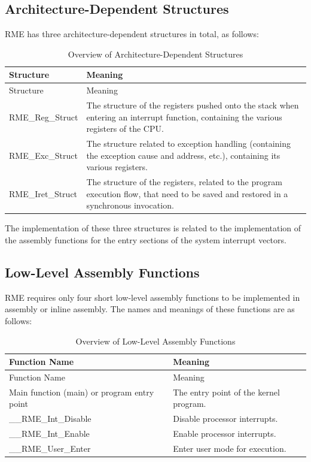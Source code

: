 \subsection{Architecture-Dependent Structures}\label{subsec:7-architecture-dependent-structs}

RME has three architecture-dependent structures in total, as follows:

\begin{xltabular}{\textwidth}{@{}>{\hsize\raggedright\arraybackslash}X>{\hsize\raggedright\arraybackslash}X@{}}
\caption{Overview of Architecture-Dependent Structures}\label{tab:7-5-architecture-dependent-structs-overview}\\
\toprule
Structure & Meaning\tabularnewline
\endfirsthead
\toprule
Structure & Meaning\tabularnewline
\midrule
\endhead
\bottomrule
\endlastfoot
RME\_Reg\_Struct &
The structure of the registers pushed onto the stack when entering an interrupt function, containing the various registers of the CPU.\tabularnewline
RME\_Exc\_Struct &
The structure related to exception handling (containing the exception cause and address, etc.), containing its various registers.\tabularnewline
RME\_Iret\_Struct &
The structure of the registers, related to the program execution flow, that need to be saved and restored in a synchronous invocation.\tabularnewline
\end{xltabular}
\nopagebreak[4]

The implementation of these three structures is related to the implementation of the assembly functions for the entry sections of the system interrupt vectors.

\subsection{Low-Level Assembly Functions}\label{subsec:7-assembly-low-level-functions}

RME requires only four short low-level assembly functions to be implemented in assembly or inline assembly. The names and meanings of these functions are as follows:

\begin{xltabular}{\textwidth}{@{}>{\hsize\raggedright\arraybackslash}X>{\hsize\raggedright\arraybackslash}X@{}}
\caption{Overview of Low-Level Assembly Functions}\label{tab:7-6-assembly-low-level-functions-overview}\\
\toprule
Function Name & Meaning\tabularnewline
\endfirsthead
\toprule
Function Name & Meaning\tabularnewline
\midrule
\endhead
\bottomrule
\endlastfoot
Main function (main) or program entry point & The entry point of the kernel program.\tabularnewline
\_\_RME\_Int\_Disable & Disable processor interrupts.\tabularnewline
\_\_RME\_Int\_Enable & Enable processor interrupts.\tabularnewline
\_\_RME\_User\_Enter & Enter user mode for execution.\tabularnewline
\end{xltabular}
\nopagebreak[4]

